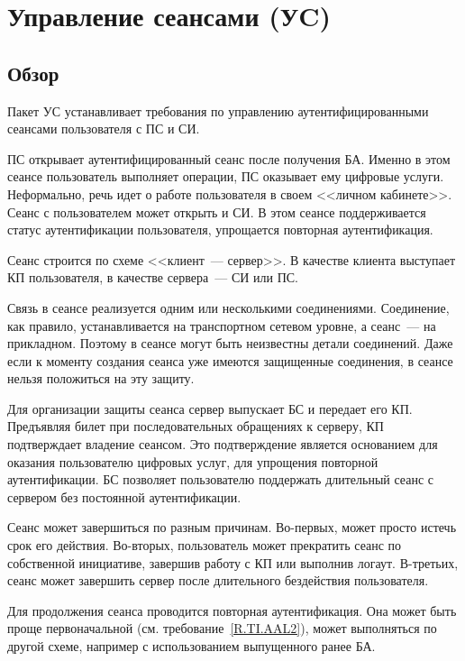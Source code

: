 \section{Управление сеансами (УC)}\label{SM}

\subsection{Обзор}\label{SM.Intro}

Пакет УС устанавливает требования по управлению аутентифицированными сеансами 
пользователя с ПС и СИ.

ПС открывает аутентифицированный сеанс после получения БА. Именно в этом сеансе 
пользователь выполняет операции, ПС оказывает ему цифровые услуги. Неформально, 
речь идет о работе пользователя в своем <<личном кабинете>>.
%
Сеанс с пользователем может открыть и СИ. В этом сеансе поддерживается статус
аутентификации пользователя, упрощается повторная аутентификация.

Сеанс строится по схеме <<клиент~--- сервер>>. В качестве клиента выступает КП
пользователя, в качестве сервера~--- СИ или ПС.

Связь в сеансе реализуется одним или несколькими соединениями. 
%
Соединение, как правило, устанавливается на транспортном 
сетевом уровне, а сеанс~--- на прикладном. Поэтому в сеансе могут
быть неизвестны детали соединений.
%
Даже если к моменту создания сеанса уже имеются защищенные соединения,
в сеансе нельзя положиться на эту защиту.

Для организации защиты сеанса сервер выпускает БС и передает его КП. 
Предъявляя билет при последовательных обращениях к серверу,
КП подтверждает владение сеансом. Это подтверждение является основанием
для оказания пользователю цифровых услуг, для упрощения повторной 
аутентификации. БС позволяет пользователю поддержать длительный 
сеанс с сервером без постоянной аутентификации.  

Сеанс может завершиться по разным причинам. Во-первых, может просто истечь
срок его действия. Во-вторых, пользователь может прекратить сеанс по 
собственной инициативе, завершив работу с КП или выполнив логаут. В-третьих, 
сеанс может завершить сервер после длительного бездействия пользователя. 

Для продолжения сеанса проводится повторная аутентификация.
%
Она может быть проще первоначальной (см. требование~\ref{R.TI.AAL2}), 
может выполняться по другой схеме, например с использованием выпущенного 
ранее БА. 


